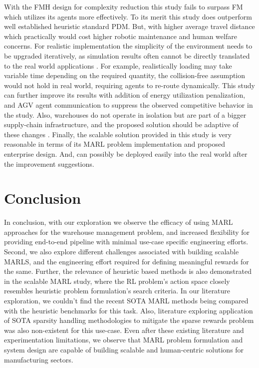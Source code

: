 \documentclass{article}
\begin{document}
With the FMH design for complexity reduction this study fails to surpass FM which utilizes its agents more effectively.
To its merit this study does outperform well established heuristic standard PDM.
But, with higher average travel distance which practically would cost higher robotic maintenance and human welfare concerns.
For realistic implementation the simplicity of the environment needs to be upgraded iteratively, as simulation results often cannot be directly translated to the real world applications \cite{zhao2020sim}.
For example, realistically loading may take variable time depending on the required quantity, the collision-free assumption would not hold in real world, requiring agents to re-route dynamically.
This study can further improve its results with addition of energy utilization penalization, and AGV agent communication to suppress the observed competitive behavior in the study.
Also, warehouses do not operate in isolation but are part of a bigger supply-chain infrastructure, and the proposed solution should be adaptive of these changes \cite{lu2018learning}.
Finally, the scalable solution provided in this study is very reasonable in terms of its MARL problem implementation and proposed enterprise design.
And, can possibly be deployed easily into the real world after the improvement suggestions.


\section{Conclusion}


In conclusion, with our exploration we observe the efficacy of using MARL approaches for the warehouse management problem, and increased flexibility for providing end-to-end pipeline with minimal use-case specific engineering efforts.
Second, we also explore different challenges associated with building scalable MARLS, and the engineering effort required for defining meaningful rewards for the same.
Further, the relevance of heuristic based methods is also demonstrated in the scalable MARL study, where the RL problem’s action space closely resembles heuristic problem formulation’s search criteria.
In our literature exploration, we couldn’t find the recent SOTA MARL methods being compared with the heuristic benchmarks for this task.
Also, literature exploring application of SOTA sparsity handling methodologies to mitigate the sparse rewards problem was also non-existent for this use-case.
Even after these existing literature and experimentation limitations, we observe that MARL problem formulation and system design are capable of building scalable and human-centric solutions for manufacturing sectors.




\end{document}
